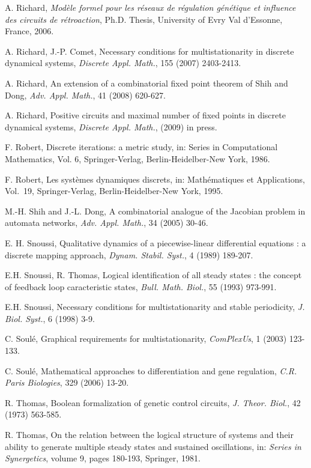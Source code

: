 \documentclass[11pt]{article}
\begin{document}
\begin{center}
\begin{thebibliography}{7}
A. Richard, {\emph{Mod\`ele formel pour les r\'eseaux de r\'egulation
g\'en\'etique et influence des circuits de r\'etroaction}},
Ph.D. Thesis, University of Evry Val d'Essonne, France, 2006.

A. Richard, J.-P. Comet, Necessary conditions for multistationarity in
discrete dynamical systems, {\emph{Discrete Appl. Math.}}, 155 (2007)
2403-2413.

A. Richard, An extension of a combinatorial fixed point theorem of
Shih and Dong, {\emph{Adv. Appl. Math.}}, 41 (2008) 620-627.  

A. Richard, Positive circuits and maximal number of fixed points in
discrete dynamical systems, {\emph{Discrete Appl. Math.}},
(2009) in press.

F. Robert, Discrete iterations: a metric study, in: Series in
Computational Mathematics, Vol. 6, Springer-Verlag,
Berlin-Heidelber-New York, 1986.

F. Robert, Les syst\`emes dynamiques discrets, in: Math\'ematiques et
Applications, Vol.~19, Springer-Verlag, Berlin-Heidelber-New York,
1995.

M.-H. Shih and J.-L. Dong, A combinatorial analogue of the Jacobian
problem in automata networks, {\emph{Adv. Appl. Math.}}, 34 (2005)
30-46.

E. H. Snoussi, Qualitative dynamics of a piecewise-linear differential
equations : a discrete mapping approach,
{\emph{Dynam. Stabil. Syst.}}, 4 (1989) 189-207.

E.H. Snoussi, R. Thomas, Logical identification of all steady states :
the concept of feedback loop caracteristic states,
{\emph{Bull. Math. Biol.}}, 55 (1993) 973-991.

E.H. Snoussi, Necessary conditions for multistationarity and stable
periodicity, {\emph{J. Biol. Syst.}}, 6 (1998) 3-9.

C. Soul\'e, Graphical requirements for multistationarity,
\emph{ComPlexUs}, 1 (2003) 123-133.

C. Soul\'e, Mathematical approaches to differentiation and gene
regulation, \emph{C.R. Paris Biologies}, 329 (2006) 13-20.

R. Thomas, Boolean formalization of genetic control
circuits, {\emph{J. Theor. Biol.}}, 42 (1973) 563-585.

R. Thomas, On the relation between the logical structure of systems
and their ability to generate multiple steady states and sustained
oscillations, in: \emph{Series in Synergetics}, volume 9, pages
180-193, Springer, 1981.


\end{thebibliography}
\end{center}
\end{document}
